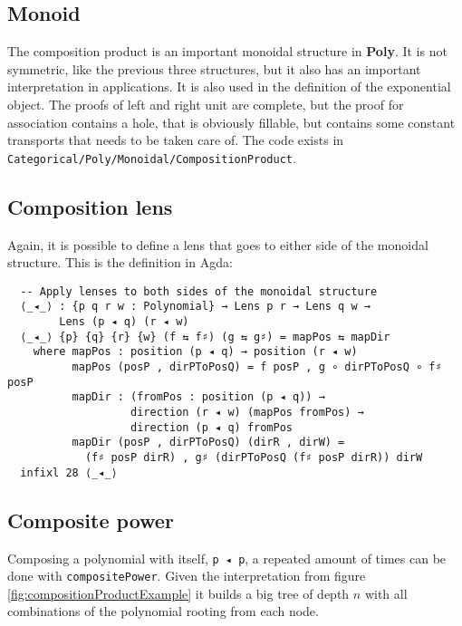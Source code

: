 \subsection{Monoid}
The composition product is an important monoidal structure in \textbf{Poly}. It is not symmetric, like the previous three structures, but it also has an important interpretation in applications. It is also used in the definition of the exponential object.
The proofs of left and right unit are complete, but the proof for association contains a hole, that is obviously fillable, but contains some constant transports that needs to be taken care of. %
The code exists in \texttt{Categorical/Poly/Monoidal/CompositionProduct}.

\subsection{Composition lens}

Again, it is possible to define a lens that goes to either side of the monoidal structure. This is the definition in Agda:

\begin{verbatim}
  -- Apply lenses to both sides of the monoidal structure
  ⟨_◂_⟩ : {p q r w : Polynomial} → Lens p r → Lens q w → 
        Lens (p ◂ q) (r ◂ w)
  ⟨_◂_⟩ {p} {q} {r} {w} (f ⇆ f♯) (g ⇆ g♯) = mapPos ⇆ mapDir
    where mapPos : position (p ◂ q) → position (r ◂ w)
          mapPos (posP , dirPToPosQ) = f posP , g ∘ dirPToPosQ ∘ f♯ posP
          mapDir : (fromPos : position (p ◂ q)) → 
                   direction (r ◂ w) (mapPos fromPos) → 
                   direction (p ◂ q) fromPos
          mapDir (posP , dirPToPosQ) (dirR , dirW) = 
            (f♯ posP dirR) , g♯ (dirPToPosQ (f♯ posP dirR)) dirW
  infixl 28 ⟨_◂_⟩
\end{verbatim}

\subsection{Composite power}
Composing a polynomial with itself, \texttt{p ◂ p}, a repeated amount of times can be done with \texttt{compositePower}.
Given the interpretation from figure \ref{fig:compositionProductExample} it builds a big tree of depth $n$ with all combinations of the polynomial rooting from each node. 

